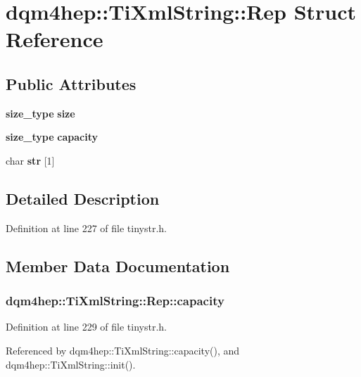 \section{dqm4hep\+:\+:Ti\+Xml\+String\+:\+:Rep Struct Reference}
\label{structdqm4hep_1_1TiXmlString_1_1Rep}
\subsection*{Public Attributes}
\begin{DoxyCompactItemize}
\item 
{\bf size\+\_\+type} {\bf size}
\item 
{\bf size\+\_\+type} {\bf capacity}
\item 
char {\bf str} [1]
\end{DoxyCompactItemize}


\subsection{Detailed Description}


Definition at line 227 of file tinystr.\+h.



\subsection{Member Data Documentation}
\subsubsection[{capacity}]{ dqm4hep\+::\+Ti\+Xml\+String\+::\+Rep\+::capacity}\label{structdqm4hep_1_1TiXmlString_1_1Rep_a18725a897c7eba18516f1ff163612f30}


Definition at line 229 of file tinystr.\+h.



Referenced by dqm4hep\+::\+Ti\+Xml\+String\+::capacity(), and dqm4hep\+::\+Ti\+Xml\+String\+::init().

